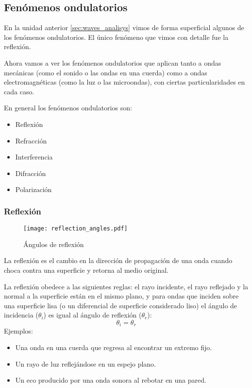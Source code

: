 \subsection{Fenómenos ondulatorios}

En la unidad anterior \ref{sec:waves_analisys} vimos de forma superficial algunos de los fenómenos ondulatorios. El único fenómeno que vimos con detalle fue la reflexión.

Ahora vamos a ver los fenómenos ondulatorios que aplican tanto a ondas mecánicas (como el sonido o las ondas en una cuerda) como a ondas electromagnéticas (como la luz o las microondas), con ciertas particularidades en cada caso.

En general los fenómenos ondulatorios son:

\begin{itemize}
  \item Reflexión
  \item Refracción
  \item Interferencia
  \item Difracción
  \item Polarización
\end{itemize}

\subsubsection{Reflexión}
\label{sec:reflection}

\begin{wrapfigure}{r}{0.24\textwidth}
  \centering
  \texttt{[image: reflection\_angles.pdf]}
  \caption{Ángulos de reflexión}
  \label{fig:reflection_angles}
\end{wrapfigure}
La reflexión es el cambio en la dirección de propagación de una onda cuando choca contra una superficie y retorna al medio original.

La reflexión obedece a las siguientes reglas: el rayo incidente, el rayo reflejado y la normal a la superficie están en el mismo plano, y para ondas que inciden sobre una superficie lisa (o un diferencial de superficie considerado liso) el ángulo de incidencia (\(\theta_i\)) es igual al ángulo de reflexión (\(\theta_r\)):
\[
  \theta_i = \theta_r
\]
Ejemplos:
\begin{itemize}
  \item Una onda en una cuerda que regresa al encontrar un extremo fijo.
  \item Un rayo de luz reflejándose en un espejo plano.
  \item Un eco producido por una onda sonora al rebotar en una pared.
\end{itemize}


